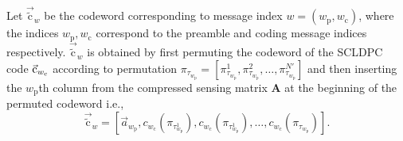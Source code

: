 Let $\vec{\tilde{\mathrm{c}}}_w$ be the codeword corresponding to message index $w=(w_{\mathrm{p}},w_{\mathrm{c}})$, where the indices $w_{\mathrm{p}},w_{\mathrm{c}}$ correspond to the preamble and coding message indices respectively. $\vec{\tilde{\mathrm{c}}}_w$ is obtained by first permuting the  codeword of the SCLDPC code $\vec{\mathrm{c}}_{w_\mathrm{c}}$ according to permutation $\pi_{\tau_{w_\mathrm{p}}}=[\pi_{\tau_{w_\mathrm{p}}}^1,\pi_{\tau_{w_\mathrm{p}}}^2,\ldots, \pi_{\tau_{w_\mathrm{p}}}^{N'}]$ and then inserting the $w_\mathrm{p}$th column from the compressed sensing matrix $\mathbf{A}$ at the beginning of the permuted codeword i.e.,
\begin{equation}\label{eqn:codeconstruction1}
  \vec{\tilde{\mathrm{c}}}_w = [\vec{a}_{w_\mathrm{p}},c_{w_\mathrm{c}}(\pi_{\tau_{w_\mathrm{p}}^1}),c_{w_\mathrm{c}}(\pi_{\tau_{w_\mathrm{p}}^1}),\ldots,c_{w_\mathrm{c}}(\pi_{\tau_{w_\mathrm{p}}})].
\end{equation}

